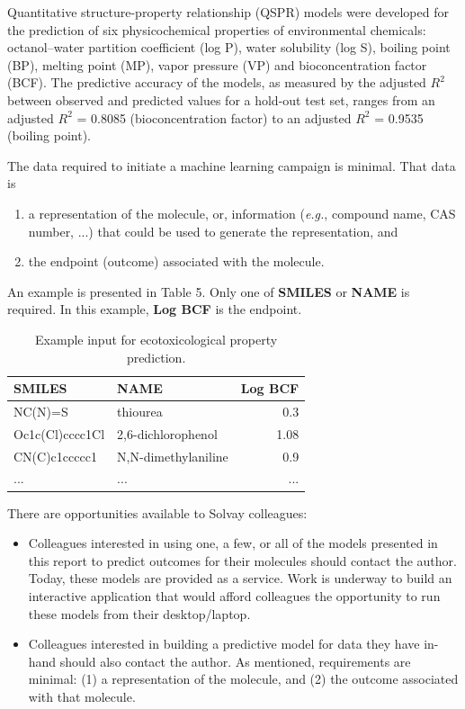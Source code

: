 \documentclass[10pt, letter]{article}
\renewcommand{\=}{\, =\, }
\newcommand{\+}{\, +\, }
\renewcommand{\-}{\, -\, }
\begin{document}
Quantitative structure-property relationship (QSPR) models were developed for the
prediction of six physicochemical properties of environmental chemicals: octanol–water
partition coefficient (log P), water solubility (log S), boiling point (BP), melting point (MP),
vapor pressure (VP) and bioconcentration factor (BCF). The predictive accuracy of the models, as measured by the adjusted \( R^2\) between observed and predicted values for a hold-out test set, ranges from an adjusted \( R^2\) = 0.8085 (bioconcentration factor) to an adjusted \( R^2\) = 0.9535 (boiling point).

The data required to initiate a machine learning campaign is minimal. That data is
\begin{enumerate}
\item a representation of the molecule, or, information (\textit{e.g.}, compound name, CAS number, ...) that could be used to generate the representation, and
\item the endpoint (outcome) associated with the molecule.
\end{enumerate}
An example is presented in Table 5. Only one of \textbf{SMILES} or \textbf{NAME} is required. In this example, \textbf{Log BCF} is the endpoint.

\begin{table}[H]
\begin{center}
\begin{tabular}{llr}
{\bf SMILES} & {\bf NAME} & {\bf Log BCF} \\
\midrule
NC(N)=S  &   thiourea & 0.3 \\
Oc1c(Cl)cccc1Cl  &  2,6-dichlorophenol & 1.08 \\
CN(C)c1ccccc1  &  N,N-dimethylaniline & 0.9 \\
...  &  ... &  ... \\
\bottomrule
\end{tabular}
\end{center}
\caption{Example input for ecotoxicological property prediction.}
\end{table}

There are opportunities available to Solvay colleagues:
\begin{itemize}
\item Colleagues interested in using one, a few, or all of the  models presented in this report to predict outcomes for their molecules should contact the author. Today, these models are provided as a service. Work is underway to build an interactive application that would afford  colleagues the opportunity to run these models from their desktop/laptop.
\item Colleagues interested in building a predictive model for data they have in-hand should also contact the author. As mentioned, requirements are minimal: (1) a representation of the molecule, and (2) the outcome associated with that molecule.
\end{itemize}
\end{document}
